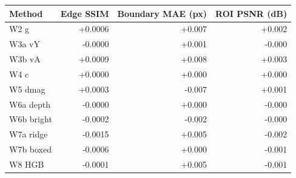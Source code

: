 \begin{tabular}{lrrr}
\toprule
Method & Edge SSIM & Boundary MAE (px) & ROI PSNR (dB) \\
\midrule
W2 g & +0.0006 & +0.007 & +0.002 \\
W3a vY & -0.0000 & +0.001 & -0.000 \\
W3b vA & +0.0009 & +0.008 & +0.003 \\
W4 c & +0.0000 & +0.000 & +0.000 \\
W5 dmag & +0.0003 & -0.007 & +0.001 \\
W6a depth & -0.0000 & +0.000 & -0.000 \\
W6b bright & -0.0002 & -0.002 & -0.000 \\
W7a ridge & -0.0015 & +0.005 & -0.002 \\
W7b boxed & -0.0006 & +0.000 & -0.001 \\
W8 HGB & -0.0001 & +0.005 & -0.001 \\
\bottomrule
\end{tabular}
